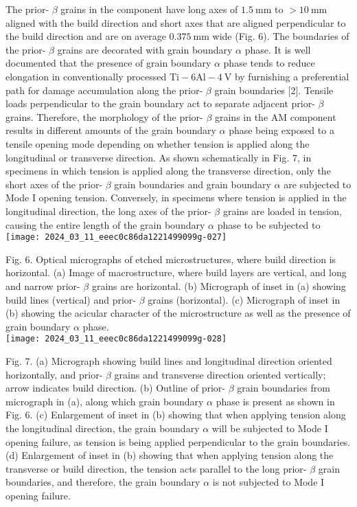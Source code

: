 \documentclass[10pt]{article}
\begin{document}
The prior- $\beta$ grains in the component have long axes of $1.5 \mathrm{~mm}$ to $>10 \mathrm{~mm}$ aligned with the build direction and short axes that are aligned perpendicular to the build direction and are on average $0.375 \mathrm{~mm}$ wide (Fig. 6). The boundaries of the prior- $\beta$ grains are decorated with grain boundary $\alpha$ phase. It is well documented that the presence of grain boundary $\alpha$ phase tends to reduce elongation in conventionally processed $\mathrm{Ti}-6 \mathrm{Al}-4 \mathrm{~V}$ by furnishing a preferential path for damage accumulation along the prior- $\beta$ grain boundaries [2]. Tensile loads perpendicular to the grain boundary act to separate adjacent prior- $\beta$ grains. Therefore, the morphology of the prior- $\beta$ grains in the AM component results in different amounts of the grain boundary $\alpha$ phase being exposed to a tensile opening mode depending on whether tension is applied along the longitudinal or transverse direction. As shown schematically in Fig. 7, in specimens in which tension is applied along the transverse direction, only the short axes of the prior- $\beta$ grain boundaries and grain boundary $\alpha$ are subjected to Mode I opening tension. Conversely, in specimens where tension is applied in the longitudinal direction, the long axes of the prior- $\beta$ grains are loaded in tension, causing the entire length of the grain boundary $\alpha$ phase to be subjected to\\
\texttt{[image: 2024\_03\_11\_eeec0c86da1221499099g-027]}

Fig. 6. Optical micrographs of etched microstructures, where build direction is horizontal. (a) Image of macrostructure, where build layers are vertical, and long and narrow prior- $\beta$ grains are horizontal. (b) Micrograph of inset in (a) showing build lines (vertical) and prior- $\beta$ grains (horizontal). (c) Micrograph of inset in (b) showing the acicular character of the microstructure as well as the presence of grain boundary $\alpha$ phase.\\
\texttt{[image: 2024\_03\_11\_eeec0c86da1221499099g-028]}

Fig. 7. (a) Micrograph showing build lines and longitudinal direction oriented horizontally, and prior- $\beta$ grains and transverse direction oriented vertically; arrow indicates build direction. (b) Outline of prior- $\beta$ grain boundaries from micrograph in (a), along which grain boundary $\alpha$ phase is present as shown in Fig. 6. (c) Enlargement of inset in (b) showing that when applying tension along the longitudinal direction, the grain boundary $\alpha$ will be subjected to Mode I opening failure, as tension is being applied perpendicular to the grain boundaries. (d) Enlargement of inset in (b) showing that when applying tension along the transverse or build direction, the tension acts parallel to the long prior- $\beta$ grain boundaries, and therefore, the grain boundary $\alpha$ is not subjected to Mode I opening failure.
\end{document}
